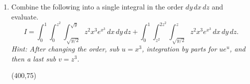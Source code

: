 \documentclass[12pt]{exam}
\begin{document}
\begin{enumerate}
\vfill

\item Combine the following into a single integral in the order
$dy\,dx\,dz$ and evaluate.
\[
  I=\int_0^1\int_0^{z^2}\int_{\sqrt{y/2}}^{\sqrt{y}}
  z^2x^3e^{x^3}\,dx\,dy\,dz
  +\int_0^1\int_{z^2}^{2z^2}\int_{\sqrt{y/2}}^z
  z^2x^3e^{x^3}\,dx\,dy\,dz.
\]
\textit{Hint: After changing the order, sub
$u=x^3$, integration by parts for \(ue^u\), and then a last sub \(v=z^3\).}

\vfill
\begin{flushright}
\framebox(400,75){}
\end{flushright}

\end{enumerate}
\end{document}
